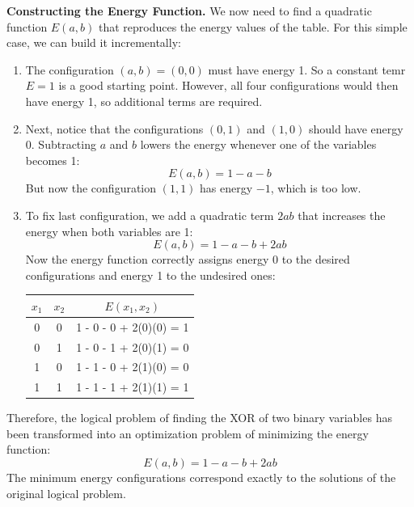 \noindent
\textcolor{Green3}{ \textbf{Constructing the Energy Function.}} We now need to find a quadratic function $E(a, b)$ that reproduces the energy values of the table. For this simple case, we can build it incrementally:
\begin{enumerate}
    \item The configuration $(a,b) = (0,0)$ must have energy 1. So a constant temr $E = 1$ is a good starting point. However, all four configurations would then have energy 1, so additional terms are required.
    \item Next, notice that the configurations $(0,1)$ and $(1,0)$ should have energy 0. Subtracting $a$ and $b$ lowers the energy whenever one of the variables becomes 1:
    \begin{equation*}
        E(a, b) = 1 - a - b
    \end{equation*}
    But now the configuration $(1,1)$ has energy $-1$, which is too low.
    \item To fix last configuration, we add a quadratic term $2ab$ that increases the energy when both variables are 1:
    \begin{equation*}
        E(a, b) = 1 - a - b + 2ab
    \end{equation*}
    Now the energy function correctly assigns energy 0 to the desired configurations and energy 1 to the undesired ones:
    \begin{table}[!htp]
        \centering
        \begin{tabular}{@{} c c | c @{}}
            \toprule
            $x_1$ & $x_2$ & $E(x_1, x_2)$ \\
            \midrule
            0 & 0 & 1 - 0 - 0 + 2(0)(0) = 1 \\
            0 & 1 & 1 - 0 - 1 + 2(0)(1) = 0 \\
            1 & 0 & 1 - 1 - 0 + 2(1)(0) = 0 \\
            1 & 1 & 1 - 1 - 1 + 2(1)(1) = 1 \\
            \bottomrule
        \end{tabular}
    \end{table}
\end{enumerate}
Therefore, the logical problem of finding the XOR of two binary variables has been transformed into an optimization problem of minimizing the energy function:
\begin{equation*}
    E(a, b) = 1 - a - b + 2ab
\end{equation*}
The minimum energy configurations correspond exactly to the solutions of the original logical problem.

